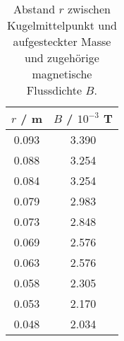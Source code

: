 \begin{table}[!htp]
\centering
\caption{Abstand $r$ zwischen Kugelmittelpunkt und aufgesteckter Masse und zugehörige magnetische Flussdichte $B$.}
\label{tab:gravi2}
\begin{tabular}{c c}
\toprule
{$r$ / m} & {$B$ / $10^{-3}$ T} \\
\midrule
0.093 & 3.390 \\
0.088 & 3.254 \\
0.084 & 3.254 \\
0.079 & 2.983 \\
0.073 & 2.848 \\
0.069 & 2.576 \\
0.063 & 2.576 \\
0.058 & 2.305 \\
0.053 & 2.170 \\
0.048 & 2.034 \\
\bottomrule
\end{tabular}
\end{table}